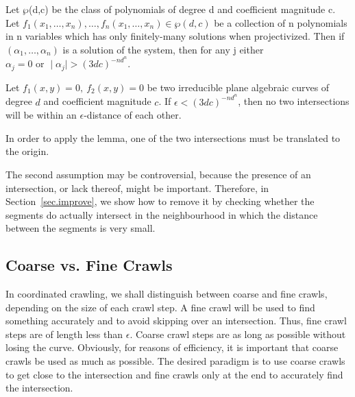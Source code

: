 \begin{lemma}
\label{thm-gap}
Let $\wp$(d,c) be the class of polynomials of degree d and coefficient magnitude c.
Let $f_{1}(x_{1},\ldots,x_{n}),\ldots,f_{n}(x_{1},\ldots,x_{n}) \in \wp(d,c)$
be a collection of n polynomials in n variables which has only 
finitely-many solutions when projectivized.
Then if $(\alpha_{1},\ldots,\alpha_{n})$ is a solution of the system,
then for any j either
$\alpha_{j} = 0 \mbox{\ \ \ \ or \ \ \ } \mid \alpha_{j} \mid > (3dc)^{-nd^{n}}$. \QED
\end{lemma}

\begin{corollary}
\label{cor-gap}
Let $f_{1}(x,y) = 0,\ f_{2}(x,y) = 0$ be two irreducible plane algebraic curves of degree 
$d$ and coefficient magnitude $c$.
If $\epsilon < (3dc)^{-nd^{n}}$, then no two intersections will 
be within an $\epsilon$-distance of each other.
%
%
\end{corollary}
In order to apply the lemma, one of the two intersections must be translated to the origin.
\QED

The second assumption may be controversial, because the presence of an 
intersection, or lack thereof, might be important.
Therefore, in Section~\ref{sec.improve}, we show how to remove it by checking whether the segments 
do actually intersect in the neighbourhood in which the distance between the segments is very 
small.  %

\subsection{Coarse vs. Fine Crawls}

In coordinated crawling, we shall distinguish between coarse and fine crawls, depending on
the size of each crawl step.
A fine crawl will be used to find something accurately and to avoid skipping over an intersection.
Thus, fine crawl steps are of length less than $\epsilon$.
Coarse crawl steps are as long as possible without losing the curve.
Obviously, for reasons of efficiency, it is important that coarse crawls be used as much as 
possible.
The desired paradigm is to use coarse crawls to get close to the intersection and 
fine crawls only at the end to accurately find the intersection.

